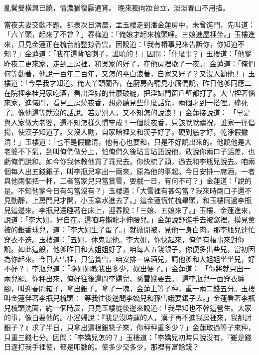 \begin{showcontents}{}
亂鬢雙橫興已饒，情濃猶復厭通宵。
晚來獨向妝台立，淡淡春山不用描。

當夜夫妻交歡不題。卻表次日清晨，孟玉樓走到潘金蓮房中，未曾進門，先叫道：「六丫頭，起來了不曾？」春梅道：「俺娘才起來梳頭哩。三娘進屋裡坐。」玉樓進來，只見金蓮正在梳台前整掠香雲。因說道：「我有椿事兒來告訴你，你知道不知？」金蓮道：「我在這背哈喇子，誰曉的！」因問：「什麼事？」玉樓道：「他爹昨夜二更來家，走到上房裡，和吳家的好了，在他房裡歇了一夜。」金蓮道：「俺們何等勸著，他說一百年二百年，又怎的平白浪著，自家又好了？又沒人勸他！」玉樓道：「今早我才知道。俺大丫頭蘭香，在廚房內聽見小廝們說，昨日他爹同應二在院裡李桂兒家吃酒，看出淫婦的什麼破綻，把淫婦門窗戶壁都打了。大雪裡著惱來家，進儀門，看見上房燒夜香，想必聽見些什麼話兒，兩個才到一搭哩。磣死了。像他這等就沒的話說。若是別人，又不知怎的說浪！」金蓮接說道： 「早是與人家做大老婆，還不知怎樣久慣牢成！一個燒夜香，只該默默禱祝，誰家一徑倡揚，使漢子知道了。又沒人勸，自家暗裡又和漢子好了。硬到底才好，乾淨假撇清！」玉樓道：「也不是假撇清，他有心也要和，只是不好說出來的。他說他是大老婆不下氣，到叫俺們做分上，怕俺們久後玷言玷語說他，敢說你兩口子話差，也虧俺們說和。如今你我休教他買了乖兒去。你快梳了頭，過去和李瓶兒說去。咱兩個每人出五錢銀子，叫李瓶兒拿出一兩來，原為他的事起。今日安排一席酒，一者與他兩個把一杯，二者當家兒只當賞雪，耍戲一日，有何不可？」金蓮道：「說的是。不知他爹今日有勾當沒有？」玉樓道：「大雪裡有甚勾當？我來時兩口子還不見動靜，上房門兒才開，小玉拿水進去了。」這金蓮慌忙梳畢頭，和玉樓同過李瓶兒這邊來。李瓶兒還睡著在床上，迎春說：「三娘、五娘來了。」玉樓、金蓮進來，說道：「李大姐，好自在。這咱時懶龍才伸腰兒。」金蓮說舒進手去被窩裡，摸見薰被的銀香球兒，道：「李大姐生了蛋了。」就掀開被，見他一身白肉。那李瓶兒連忙穿衣不迭。玉樓道：「五姐，休鬼混他。李大姐，你快起來，俺們有椿事來對你說。如此這般，他爹昨日和大姐姐好了，咱每人五錢銀子，你便多出些兒，當初因為你起來。今日大雪裡，只當賞雪，咱安排一席酒兒，請他爹和大姐姐坐坐兒，好不好？」李瓶兒道：「隨姐姐教我出多少，奴出便了。」金蓮道： 「你將就只出一兩兒罷。你秤出來，俺好往後邊問李嬌兒、孫雪娥要去。」這李瓶兒一面穿衣纏腳，叫迎春開箱子，拿出銀子。拿了一塊，金蓮上等子秤，重一兩二錢五分。玉樓叫金蓮伴著李瓶兒梳頭：「等我往後邊問李嬌兒和孫雪娥要銀子去。」金蓮看著李瓶兒梳頭洗面，約一個時辰，只見玉樓從後邊來說道：「我早知也不幹這營生。大家的事，像白要他的。小淫婦說：『我是沒時運的人，漢子再不進我房裡來，我那討銀子？』求了半日，只拿出這根銀簪子來，你秤秤重多少？」金蓮取過等子來秤，只重三錢七分。因問：「李嬌兒怎的？」玉樓道：「李嬌兒初時只說沒有，『雖是錢日逐打我手裡使，都是叩數的。使多少交多少，那裡有富餘錢？ 
\end{showcontents}
